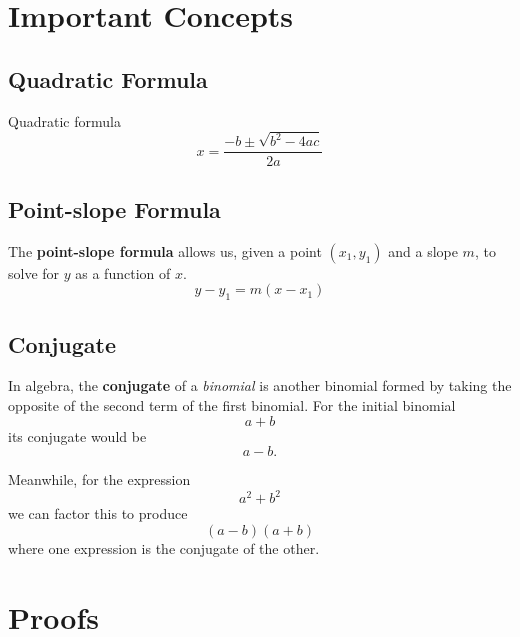 \chapter{Important Concepts}

\section{Quadratic Formula}
Quadratic formula
\begin{equation}
  x=\frac{-b\pm\sqrt{b^2-4ac}}{2a}
  \label{app:eq:quadratic}
\end{equation}

\section{Point-slope Formula}
\label{sec:pointslope}
The \textbf{point-slope formula} allows us, given a point $(x_1, y_1)$ and a slope $m$, to solve for $y$ as a function of $x$.
\begin{equation}
  \label{eq:pointslope}
  y-y_1=m(x-x_1)
\end{equation}

\section{Conjugate}\label{app:def:conjugate}
In algebra, the \textbf{conjugate} of a \emph{binomial} is another binomial formed by taking the opposite of the second term of the first binomial. For the initial binomial
\[ a + b\]
its conjugate would be
\[a - b.\]

Meanwhile, for the expression \[a^2+b^2\] we can factor this to produce \[(a-b)(a+b)\] where one expression is the conjugate of the other.

\chapter{Proofs}

